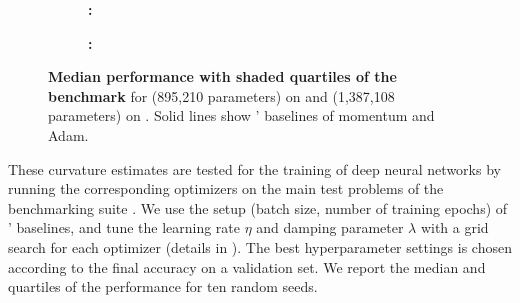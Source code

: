 \begin{figure*}[!t]
  \centering
  \begin{subfigure}[t]{1.0\linewidth}
    \centering
    \caption{}\label{backpack::subfig:cifar1}
    \vspace{-5.5ex}
    \begin{center}\textbf{\footnotesize \CIFARTEN : \CIFARTENNET}\end{center}
    \tikzexternalenable
    \tikzexternaldisable
  \end{subfigure}
  \vspace{-2ex}
  \begin{subfigure}[t]{1.0\linewidth}
    \centering
    \caption{}\label{backpack::subfig:cifar2}
    \vspace{-5.5ex}
    \begin{center}\textbf{\footnotesize \CIFARHUN : \ALLCNNC}\end{center}
    \tikzexternalenable
    \tikzexternaldisable
  \end{subfigure}
  \caption{\textbf{Median performance with shaded quartiles of the \DeepOBS
      benchmark} for  \CIFARTENNET (895,210
    parameters) on \CIFARTEN and  \ALLCNNC
    (1,387,108 parameters) on \CIFARHUN. Solid lines show \DeepOBS' baselines of
    momentum \SGD and Adam.}
  \label{backpack::fig:cifar}
\end{figure*}

These curvature estimates are tested for the training of deep neural networks by
running the corresponding optimizers on the main test problems of the
benchmarking suite \DeepOBS{} \citep{schneider2019deepobs}. We use the setup
(batch size, number of training epochs) of \DeepOBS' baselines, and tune the
learning rate $\eta$ and damping parameter $\lambda$ with a grid search for
each optimizer (details in ). The best
hyperparameter settings is chosen according to the final accuracy on a
validation set. We report the median and quartiles of the performance for ten
random seeds.

